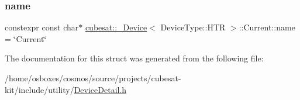 \subsubsection{\texorpdfstring{name}{name}}
{\footnotesize\ttfamily constexpr const char$\ast$ \hyperlink{structcubesat_1_1__Device}{cubesat\+::\+\_\+\+Device}$<$ Device\+Type\+::\+H\+TR $>$\+::Current\+::name = \char`\"{}Current\char`\"{}\hspace{0.3cm}{\ttfamily [static]}}



The documentation for this struct was generated from the following file\+:\begin{DoxyCompactItemize}
\item 
/home/osboxes/cosmos/source/projects/cubesat-\/kit/include/utility/\hyperlink{DeviceDetail_8h}{Device\+Detail.\+h}\end{DoxyCompactItemize}
